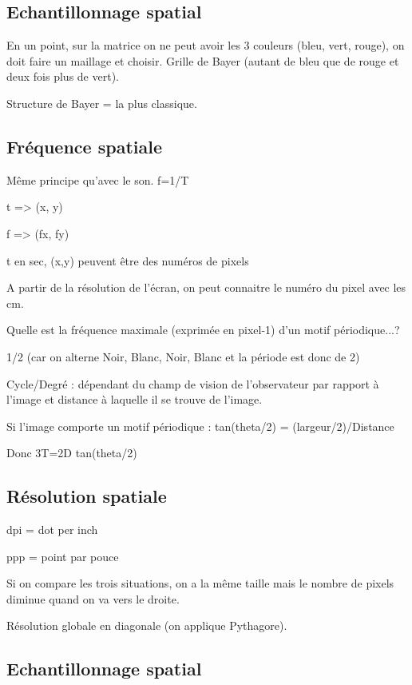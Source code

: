 \documentclass{report}
\begin{document}
\subsection*{Echantillonnage spatial}

En un point, sur la matrice on ne peut avoir les 3 couleurs (bleu, vert, rouge), on doit faire un maillage et choisir. Grille de Bayer (autant de bleu que de rouge et deux fois plus de vert).

Structure de Bayer = la plus classique. 

\subsection*{Fréquence spatiale}

Même principe qu'avec le son. f=1/T

t => (x, y)

f => (fx, fy)

t en sec, (x,y) peuvent être des numéros de pixels

A partir de la résolution de l'écran, on peut connaitre le numéro du pixel avec les cm.

Quelle est la fréquence maximale (exprimée en pixel-1) d'un motif périodique...?

1/2 (car on alterne Noir, Blanc, Noir, Blanc et la période est donc de 2)

Cycle/Degré : dépendant du champ de vision de l'observateur par rapport à l'image et distance à laquelle il se trouve de l'image.

Si l'image comporte un motif périodique : tan(theta/2) = (largeur/2)/Distance

Donc 3T=2D tan(theta/2)

\subsection*{Résolution spatiale}

dpi = dot per inch

ppp = point par pouce

Si on compare les trois situations, on a la même taille mais le nombre de pixels diminue quand on va vers le droite.

Résolution globale en diagonale (on applique Pythagore).

\subsection*{Echantillonnage spatial}
\end{document}
